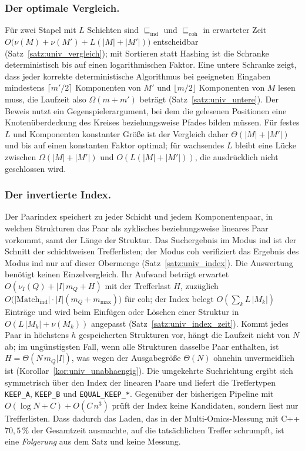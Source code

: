 \documentclass[a4paper,12pt, twoside]{report}
\theoremstyle{definition}
\begin{document}
\subsubsection{Der optimale Vergleich.} Für zwei Stapel mit $L$ Schichten sind $\sqsubseteq_{\mathrm{ind}}$ und $\sqsubseteq_{\mathrm{coh}}$ in erwarteter Zeit $O\big(\nu(M)+\nu(M')+L(|M|+|M'|)\big)$ entscheidbar (Satz~\ref{satz:univ_vergleich}); mit Sortieren statt Hashing ist die Schranke deterministisch bis auf einen logarithmischen Faktor. Eine untere Schranke zeigt, dass jeder korrekte deterministische Algorithmus bei geeigneten Eingaben mindestens $\lceil m'/2\rceil$ Komponenten von $M'$ und $\lfloor m/2\rfloor$ Komponenten von $M$ lesen muss, die Laufzeit also $\Omega(m+m')$ beträgt (Satz~\ref{satz:univ_untere}). Der Beweis nutzt ein Gegenspielerargument, bei dem die gelesenen Positionen eine Knotenüberdeckung des Kreises beziehungsweise Pfades bilden müssen. Für festes $L$ und Komponenten konstanter Größe ist der Vergleich daher $\Theta(|M|+|M'|)$ und bis auf einen konstanten Faktor optimal; für wachsendes $L$ bleibt eine Lücke zwischen $\Omega(|M|+|M'|)$ und $O(L(|M|+|M'|))$, die ausdrücklich nicht geschlossen wird.

\subsubsection{Der invertierte Index.} Der Paarindex speichert zu jeder Schicht und jedem Komponentenpaar, in welchen Strukturen das Paar als zyklisches beziehungsweise lineares Paar vorkommt, samt der Länge der Struktur. Das Suchergebnis im Modus ind ist der Schnitt der schichtweisen Trefferlisten; der Modus coh verifiziert das Ergebnis des Modus ind nur auf dieser Obermenge (Satz~\ref{satz:univ_index}). Die Auswertung benötigt keinen Einzelvergleich. Ihr Aufwand beträgt erwartet $O(\nu_I(Q)+|I|\,m_Q+H)$ mit der Trefferlast $H$, zuzüglich $O\big(|\mathrm{Match}_{\mathrm{ind}}|\cdot|I|(m_Q+m_{\max})\big)$ für coh; der Index belegt $O(\sum_k L\,|M_k|)$ Einträge und wird beim Einfügen oder Löschen einer Struktur in $O(L\,|M_k|+\nu(M_k))$ angepasst (Satz~\ref{satz:univ_index_zeit}). Kommt jedes Paar in höchstens $h$ gespeicherten Strukturen vor, hängt die Laufzeit nicht von $N$ ab; im ungünstigsten Fall, wenn alle Strukturen dasselbe Paar enthalten, ist $H=\Theta(N\,m_Q|I|)$, was wegen der Ausgabegröße $\Theta(N)$ ohnehin unvermeidlich ist (Korollar~\ref{kor:univ_unabhaengig}). Die umgekehrte Suchrichtung ergibt sich symmetrisch über den Index der linearen Paare und liefert die Treffertypen \texttt{KEEP\_A}, \texttt{KEEP\_B} und \texttt{EQUAL\_KEEP\_*}. Gegenüber der bisherigen Pipeline mit $O(\log N+C)+O(C\,n^3)$ prüft der Index keine Kandidaten, sondern liest nur Trefferlisten. Dass dadurch das Laden, das in der Multi-Omics-Messung mit C++ $70{,}5\,\%$ der Gesamtzeit ausmachte, auf die tatsächlichen Treffer schrumpft, ist eine \emph{Folgerung} aus dem Satz und keine Messung.
\end{document}
